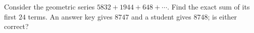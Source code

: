 Consider the geometric series $5832+1944+648+\cdots$. Find the exact sum of its first $24$ terms. An answer key gives $8747$ and a student gives $8748$; is either correct?
